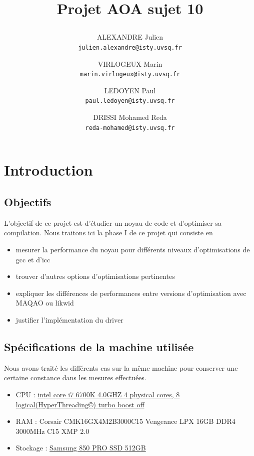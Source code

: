 \documentclass{report}
\begin{document}
\title{
  \begin{minipage}\linewidth
      \centering
      Projet AOA sujet 10
      \vskip 5pt
      \author{
        ALEXANDRE Julien \\
        \texttt{julien.alexandre@isty.uvsq.fr}
      \and
        VIRLOGEUX Marin \\
        \texttt{marin.virlogeux@isty.uvsq.fr}
      \and
        LEDOYEN Paul \\
        \texttt{paul.ledoyen@isty.uvsq.fr}
      \and
        DRISSI Mohamed Reda \\
        \texttt{reda-mohamed@isty.uvsq.fr}
      }
    \end{minipage}
}
\maketitle
\newpage
\tableofcontents
\newpage
\section{Introduction}
 \subsection{Objectifs}
  	L'objectif de ce projet est d'étudier un noyau de code et d'optimiser sa compilation. Nous traitons ici la phase I de ce projet qui consiste en 
  	\begin{itemize}
  	\item mesurer la performance du noyau pour différents niveaux d'optimisations de gcc et d'icc
  	\item trouver d'autres options d'optimisations pertinentes
	\item expliquer les différences de performances entre versions d'optimisation avec MAQAO ou likwid
	\item justifier l'implémentation du driver
  	\end{itemize}
  \subsection{Spécifications de la machine utilisée}
  Nous avons traité les différents cas sur la même machine pour conserver une certaine constance dans les mesures effectuées.
    \begin{itemize}
      \item CPU : \href{https://ark.intel.com/products/88195/Intel-Core-i7-6700K-Processor-8M-Cache-up-to-4_20-GHz}
        {intel core i7 6700K 4.0GHZ 4 physical cores, 8 logical(HyperThreading©) turbo boost off}
      \item RAM : Corsair CMK16GX4M2B3000C15 Vengeance LPX 16GB DDR4 3000MHz C15 XMP 2.0
      \item Stockage : \href{http://downloadcenter.samsung.com/content/UM/201711/20171115103115156/Samsung_SSD_850_PRO_Data_Sheet_Rev_3.pdf}
          {Samsung 850 PRO SSD 512GB}
    \end{itemize}
\end{document}
